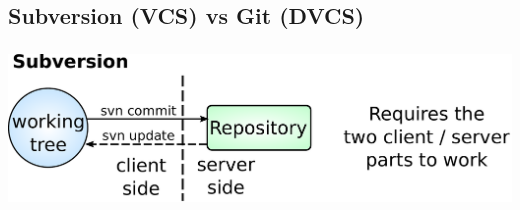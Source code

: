 \subsection{Subversion (VCS) vs Git (DVCS)}
\begin{frame}
  \frametitle{\insertsubsection}
  \begin{center}
    \includegraphics[height=0.30\textheight]{images/pdf/svn-layout.pdf}
     \ \\ \vspacing \vspacing \vspacing
  \end{center}
\end{frame}


